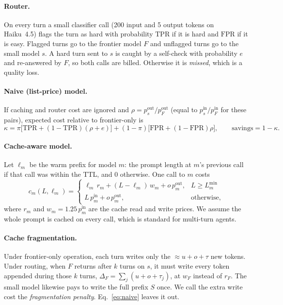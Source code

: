 \documentclass[10pt]{article}
\newcommand{\pin}{p^{\mathrm{in}}}\newcommand{\pout}{p^{\mathrm{out}}}
\begin{document}
\paragraph{Router.} On every turn a small classifier call (200 input and 5 output tokens on Haiku~4.5) flags the turn as hard with probability $\mathrm{TPR}$ if it is hard and $\mathrm{FPR}$ if it is easy. Flagged turns go to the frontier model $F$ and unflagged turns go to the small model $s$. A hard turn sent to $s$ is caught by a self-check with probability $e$ and re-answered by $F$, so both calls are billed. Otherwise it is \emph{missed}, which is a quality loss.

\paragraph{Naive (list-price) model.} If caching and router cost are ignored and $\rho = \pout_s/\pout_F$ (equal to $\pin_s/\pin_F$ for these pairs), expected cost relative to frontier-only is
\begin{equation}\label{eq:naive}
\kappa = \pi\big[\mathrm{TPR} + (1-\mathrm{TPR})(\rho+e)\big] + (1-\pi)\big[\mathrm{FPR} + (1-\mathrm{FPR})\rho\big],\qquad \text{savings} = 1-\kappa .
\end{equation}

\paragraph{Cache-aware model.} Let $\ell_m$ be the warm prefix for model $m$: the prompt length at $m$'s previous call if that call was within the TTL, and $0$ otherwise. One call to $m$ costs
\begin{equation}\label{eq:call}
c_m(L,\ell_m) = \begin{cases}\ell_m\, r_m + (L-\ell_m)\, w_m + o\,\pout_m, & L \ge L^{\min}_m\\[2pt] L\,\pin_m + o\,\pout_m, & \text{otherwise,}\end{cases}
\end{equation}
where $r_m$ and $w_m=1.25\,\pin_m$ are the cache read and write prices. We assume the whole prompt is cached on every call, which is standard for multi-turn agents.

\paragraph{Cache fragmentation.} Under frontier-only operation, each turn writes only the $\approx u+o+\tau$ new tokens. Under routing, when $F$ returns after $k$ turns on $s$, it must write every token appended during those $k$ turns, $\Delta_F=\sum_{j}(u+o+\tau_j)$, at $w_F$ instead of $r_F$. The small model likewise pays to write the full prefix $S$ once. We call the extra write cost the \emph{fragmentation penalty}. Eq.~\eqref{eq:naive} leaves it out.
\end{document}
